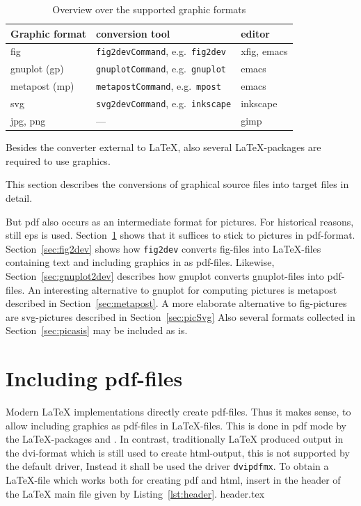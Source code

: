 \documentclass[12pt]{book}
\newcommand{\gls}[1]{#1}
\begin{document}
\begin{longtable}{|l|ll|}
\toprule
Graphic format & conversion tool & editor \\
\midrule
\midrule
\endfirsthead%
\bottomrule
\caption{\label{tab:graphicOverview} 
Overview over the supported graphic formats }
\endlastfoot%
fig             & \texttt{fig2devCommand}, e.g.~\texttt{fig2dev}  & xfig, emacs   \\
gnuplot (gp)    & \texttt{gnuplotCommand}, e.g.~\texttt{gnuplot}  & emacs         \\
metapost (mp)   & \texttt{metapostCommand}, e.g.~\texttt{mpost}   & emacs         \\
svg             & \texttt{svg2devCommand}, e.g.~\texttt{inkscape} & inkscape      \\
jpg, png        & ---        & gimp          \\
\end{longtable}

Besides the converter external to \LaTeX, 
also several \LaTeX-packages are required 
to use graphics. 


This section describes the conversions of 
graphical source files into target files 
in detail. 

But pdf also occurs as an intermediate format for pictures. 
For historical reasons, still \gls{eps} is used. 
Section~\ref{sec:figpdf} shows that it suffices to stick to pictures 
in pdf-format. 
Section~\ref{sec:fig2dev} shows how \texttt{fig2dev} converts fig-files 
into \LaTeX-files containing text and including graphics in as pdf-files. 
Likewise, Section~\ref{sec:gnuplot2dev} describes 
how gnuplot converts gnuplot-files into pdf-files. 
An interesting alternative to gnuplot for computing pictures 
is metapost described in Section~\ref{sec:metapost}. 
A more elaborate alternative to fig-pictures are svg-pictures 
described in Section~\ref{sec:picSvg}
Also several formats collected in Section~\ref{sec:picasis} 
may be included as is. 



\section{Including pdf-files}\label{sec:figpdf}

Modern \LaTeX{} implementations directly create pdf-files. 
Thus it makes sense, to allow including graphics as pdf-files 
in \LaTeX-files. 
This is done in pdf mode 
by the \LaTeX-packages  and . 
In contrast, traditionally \LaTeX{} produced output in the \gls{dvi}-format 
which is still used to create \gls{html}-output, 
this is not supported by the default driver, 
Instead it shall be used the driver \texttt{dvipdfmx}. 
To obtain a \LaTeX-file which works both for creating pdf and html, 
insert in the header of the \LaTeX{} main file
given by Listing~\ref{lst:header}. 
%
%
{header.tex}
\end{document}
